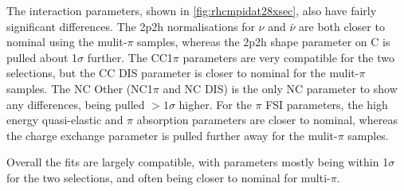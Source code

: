 The interaction parameters, shown in \ref{fig:rhcmpidat28xsec}, also have fairly significant differences. The 2p2h normalisations for $\nu$ and $\bar{\nu}$ are both closer to nominal using the mulit-$\pi$ samples, whereas the 2p2h shape parameter on C is pulled about 1$\sigma$ further. The CC1$\pi$ parameters are very compatible for the two selections, but the CC DIS parameter is closer to nominal for the mulit-$\pi$ samples. The NC Other (NC1$\pi$ and NC DIS) is the only NC parameter to show any differences, being pulled $>1\sigma$ higher. For the $\pi$ FSI parameters, the high energy quasi-elastic and $\pi$ absorption parameters are closer to nominal, whereas the charge exchange parameter is pulled further away for the mulit-$\pi$ samples.

Overall the fits are largely compatible, with parameters mostly being within 1$\sigma$ for the two selections, and often being closer to nominal for multi-$\pi$.

